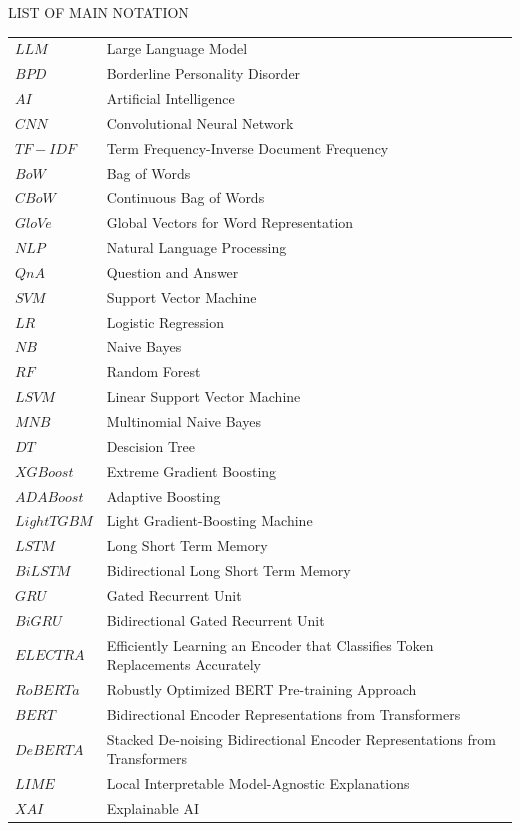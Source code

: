 \clearpage
\newpage
\begin{center}
  {\Large LIST OF MAIN NOTATION}\\[50pt]
\end{center}
\noindent
\begin{longtable}[l]{p{80pt}p{300pt}}

$LLM$      & Large Language Model \\
$BPD$      & Borderline Personality Disorder \\
$AI$ &Artificial Intelligence \\
$CNN$ 	  &	 Convolutional Neural Network \\
$TF-IDF$ & Term Frequency-Inverse Document Frequency \\
$BoW$ & Bag of Words\\
$CBoW$ & Continuous Bag of Words \\
$GloVe$ & Global Vectors for Word Representation \\
$NLP$ & Natural Language Processing \\
$QnA$ & Question and Answer \\
$SVM$ & Support Vector Machine \\
$LR$ & Logistic Regression \\
$NB$ &Naive Bayes \\
$RF$ & Random Forest \\
$LSVM$ & Linear Support Vector Machine \\
$MNB$ & Multinomial Naive Bayes\\
$DT$ & Descision Tree \\
$XGBoost$ & Extreme Gradient Boosting \\
$ADABoost$ &Adaptive Boosting \\
$LightTGBM$ & Light Gradient-Boosting Machine \\
$LSTM$ &Long Short Term Memory \\
$BiLSTM$ &Bidirectional Long Short Term Memory \\
$GRU$ &Gated Recurrent Unit\\
$BiGRU$ &Bidirectional Gated Recurrent Unit \\
$ELECTRA$ &Efficiently Learning an Encoder that Classifies Token Replacements Accurately \\
$RoBERTa$ & Robustly Optimized BERT Pre-training Approach\\
$BERT$ & Bidirectional Encoder Representations from Transformers\\
$DeBERTA$ &Stacked De-noising Bidirectional Encoder Representations from Transformers\\
$LIME$ & Local Interpretable Model-Agnostic Explanations \\
$XAI$ & Explainable AI \\

\end{longtable}


